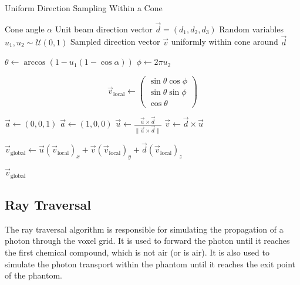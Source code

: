\begin{algorithm}[H]
\caption{Uniform Direction Sampling Within a Cone}
\label{alg:uniformDirectionSampling}
\begin{algorithmic}[1]
\Require Cone angle $\alpha$
\Require Unit beam direction vector $\vec{d} = (d_1, d_2, d_3)$
\Require Random variables $u_1, u_2 \sim \mathcal{U}(0,1)$
\Ensure Sampled direction vector $\vec{v}$ uniformly within cone around
$\vec{d}$


\State $\theta \gets \arccos(1 - u_1 (1 - \cos \alpha))$ 
\State $\phi \gets 2\pi u_2$ 


\State $$\vec{v}_{\text{local}} \gets 
\begin{pmatrix}
\sin\theta \cos\phi \\
\sin\theta \sin\phi \\
\cos\theta \end{pmatrix}$$

    \State $\vec{a} \gets (0, 0, 1)$
\Else
    \State $\vec{a} \gets (1, 0, 0)$
\EndIf
\State $\vec{u} \gets \frac{\vec{a} \times \vec{d}}{\|\vec{a} \times \vec{d}\|}$ 
\State $\vec{v} \gets \vec{d} \times \vec{u}$ 

\State $\vec{v}_{\text{global}} \gets \vec{u} (\vec{v}_{\text{local}})_x + \vec{v} (\vec{v}_{\text{local}})_y + \vec{d} (\vec{v}_{\text{local}})_z$

\State \Return $\vec{v}_{\text{global}}$

\end{algorithmic}
\end{algorithm}


\subsection{Ray Traversal}
\label{sec:rayTraversal}

The ray traversal algorithm is responsible for simulating the propagation of a
photon through the voxel grid. It is used to forward the photon until it reaches
the first chemical compound, which is not air (or is air). It is also
used to simulate the photon transport within the phantom until it reaches the
exit point of the phantom.

